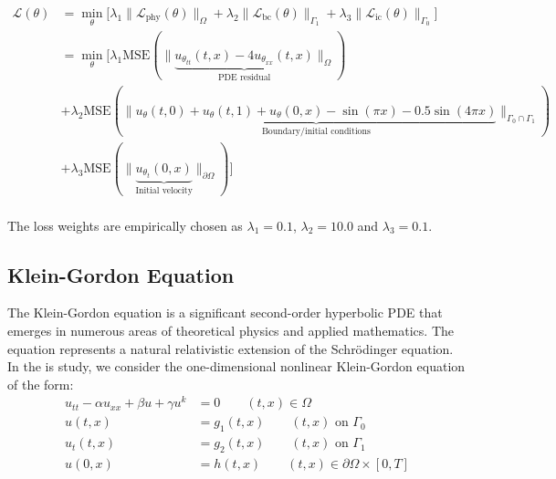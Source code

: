 \begin{equation}
    \begin{split}
\mathcal{L}(\theta) &= \underset{\theta}{\min} \big[ \lambda_1\|\mathcal{L}_{\text{phy}}(\theta)\|_{\Omega}  +   \lambda_2 \|\mathcal{L}_{\text{bc}}(\theta)\|_{\Gamma_1}   +  \lambda_3\|\mathcal{L}_{\text{ic}}(\theta)\|_{\Gamma_0} \big] \\
&= \underset{\theta}{\min} \big[ \lambda_1\text{MSE}( \|\underbrace{u_{\theta_{tt}}(t,x) -4u_{\theta_{xx}}(t,x)}_{\text{PDE residual}}\|_{\Omega})  \\
&+   \lambda_2\text{MSE}( \|\underbrace{u_\theta(t,0) + u_\theta(t,1) + u_\theta(0,x) - \sin(\pi x) - 0.5 \sin(4\pi x) }_{\text{Boundary/initial conditions}}\|_{{\Gamma_0}\cap {\Gamma_1}}) \\
&+  \lambda_3\text{MSE}( \|\underbrace{u_{\theta_{t}}(0,x)}_{\text{Initial velocity}}\|_{\partial \Omega}) \big]\\
    \end{split} 
    \label{eq:1DWave_Loss1}
\end{equation}

\noindent The loss weights are empirically chosen as $\lambda_1 = 0.1$, $\lambda_2 = 10.0$ and $\lambda_3 = 0.1$.
\subsection{Klein-Gordon Equation}
The Klein-Gordon equation is a significant second-order hyperbolic PDE that emerges in numerous areas of theoretical physics and applied mathematics. The equation represents a natural relativistic extension of the Schrödinger equation.
%
In the is study, we consider the one-dimensional nonlinear Klein-Gordon equation of the form:
\begin{equation}
\begin{split}
        u_{tt} - \alpha u_{xx} + \beta u + \gamma u^k &= 0 \qquad(t ,x) \in \Omega\\ 
        u(t,x) &= g_1(t,x) \qquad (t,x) \text{ on } \Gamma_0\\
        u_t(t,x) &= g_2(t,x)\qquad (t,x) \text{ on } \Gamma_1\\
        u(0,x) &= h(t,x)  \qquad (t,x) \in \partial \Omega \times [0,T]\\
\end{split}
\end{equation}

